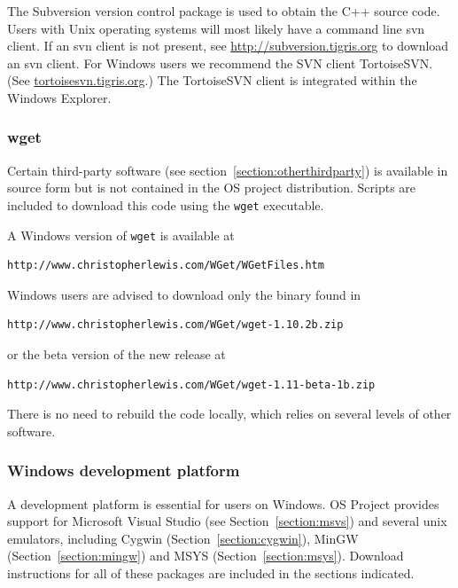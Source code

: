 \documentclass[11pt]{article}
\renewcommand{\_}{{\char"5F}}
\renewcommand{\{}{{\char"7B}}
\renewcommand{\}}{{\char"7D}}
\renewcommand{\^}{{\char"0D}}
\renewcommand{\'}{{\char"0D}}
\begin{document}
The Subversion version control package is used to obtain the C++ source code.  
Users with Unix operating systems will most likely have a command line svn client.  If an svn client is not present, 
see \url{http://subversion.tigris.org} to download an svn client.   For Windows users we recommend the  
SVN client  TortoiseSVN.  (See \url{tortoisesvn.tigris.org}.)  The TortoiseSVN client is integrated within the 
Windows  Explorer.

\subsubsection{wget}\label{section:wget}
Certain third-party software (see section~\ref{section:otherthirdparty}) is available in source form but is not 
contained in the OS project distribution. Scripts are included to download this code using the 
{\tt wget} executable.


A Windows version of {\tt wget} is available at

\begin{verbatim}
http://www.christopherlewis.com/WGet/WGetFiles.htm
\end{verbatim}

Windows users are advised to download only the binary found in

\begin{verbatim}
http://www.christopherlewis.com/WGet/wget-1.10.2b.zip
\end{verbatim}
or the beta version of the new release at
\begin{verbatim}
http://www.christopherlewis.com/WGet/wget-1.11-beta-1b.zip
\end{verbatim}

There is no need to rebuild the code locally, which relies on several levels of other software.

\subsubsection{Windows development platform}\label{section:windowsdevelopment}
A development platform is essential for users on Windows. OS Project provides support for Microsoft Visual Studio 
(see Section~\ref{section:msvs}) and several unix emulators, including Cygwin (Section~\ref{section:cygwin}), 
MinGW (Section~\ref{section:mingw}) and MSYS (Section~\ref{section:msys}). Download instructions for all of these 
packages are included in the sections indicated.
\end{document}
